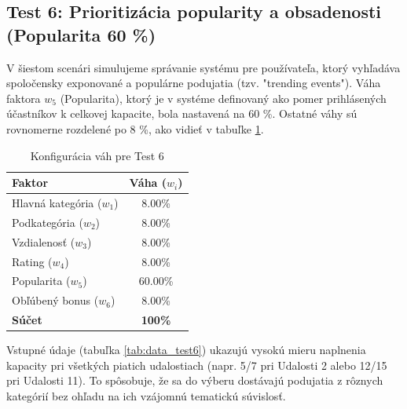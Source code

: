 \documentclass[12pt,a4paper]{article}
\begin{document}
\subsection{Test 6: Prioritizácia popularity a obsadenosti (Popularita 60 \%)}

V šiestom scenári simulujeme správanie systému pre používateľa, ktorý vyhľadáva spoločensky exponované a populárne podujatia (tzv. "trending events"). Váha faktora $w_5$ (Popularita), ktorý je v systéme definovaný ako pomer prihlásených účastníkov k celkovej kapacite, bola nastavená na 60 \%. Ostatné váhy sú rovnomerne rozdelené po 8 \%, ako vidieť v tabuľke \ref{tab:vahy_test6}.

\begin{table}[H]
\centering
\begin{tabular}{|l|c|}
\hline
\textbf{Faktor} & \textbf{Váha ($w_i$)} \\
\hline
Hlavná kategória ($w_1$) & 8.00\% \\
Podkategória ($w_2$) & 8.00\% \\
Vzdialenosť ($w_3$) & 8.00\% \\
Rating ($w_4$) & 8.00\% \\
Popularita ($w_5$) & 60.00\% \\
Obľúbený bonus ($w_6$) & 8.00\% \\
\hline
\textbf{Súčet} & \textbf{100\%} \\
\hline
\end{tabular}
\caption{Konfigurácia váh pre Test 6}
\label{tab:vahy_test6}
\end{table}

Vstupné údaje (tabuľka \ref{tab:data_test6}) ukazujú vysokú mieru naplnenia kapacity pri všetkých piatich udalostiach (napr. 5/7 pri Udalosti 2 alebo 12/15 pri Udalosti 11). To spôsobuje, že sa do výberu dostávajú podujatia z rôznych kategórií bez ohľadu na ich vzájomnú tematickú súvislosť.
\end{document}
